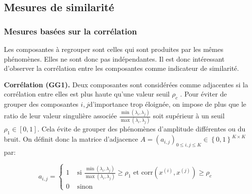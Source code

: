 \documentclass{gretsi}
\newcommand{\inter}{\left[0, 1\right]}
\begin{document}

\vspace{-.4cm}
\subsection{Mesures de similarité}
\label{sub:sim}

\subsubsection{Mesures basées sur la corrélation}\label{ssub:cor}
\vspace{-.1cm}

Les composantes à regrouper sont celles qui sont produites par les mêmes phénomènes.
Elles ne sont donc pas indépendantes.
Il est donc intéressant d'observer la corrélation entre les composantes comme indicateur de similarité.

\begin{sloppypar}
\noindent\textbf{Corrélation (GG1).}\label{par:GG1}
    Deux composantes sont considérées comme adjacentes si la corrélation entre elles est plus haute qu'une valeur seuil $\rho_c$ \cite{abalov_14_auto}.
    Pour éviter de grouper des composantes $i, j$d'importance trop éloignée, on impose de plus que le ratio de leur valeur singulière associée $\frac{\min(\lambda_i, \lambda_j)}{\max(\lambda_i, \lambda_j)}$ soit supérieur à un seuil $\rho_1 \in \inter$.
    Cela évite de grouper des phénomènes d'amplitude différentes ou du bruit.
    On définit donc la matrice d'adjacence $A = (a_{i, j})_{0 \le i,j\le K} \in \left \{ 0, 1 \right \}^{K\times K}$ par:\end{sloppypar}
    \vspace{-.4cm}
    \begin{equation}
        a_{i, j} = \begin{cases}
	        1 &\text{ si } \displaystyle\frac{\min(\lambda_i, \lambda_j)}{\max(\lambda_i, \lambda_j)} \ge \rho_1 \text{ et } \text{corr}(x^{(i)}, x^{(j)}) \ge \rho_c\\
	        0& \text{ sinon}
        \end{cases}
    \end{equation}
\end{document}
